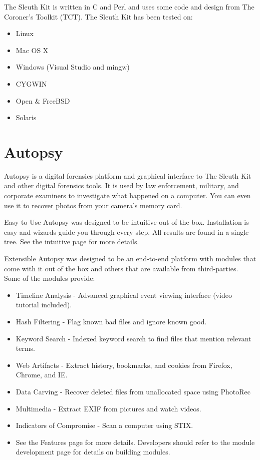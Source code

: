 The Sleuth Kit is written in C and Perl and uses some code and design from 
The Coroner's Toolkit (TCT). The Sleuth Kit has been tested on:

\begin{itemize}
\item Linux
\item Mac OS X
\item Windows (Visual Studio and mingw)
\item CYGWIN
\item Open \& FreeBSD
\item Solaris
\end{itemize}

\section{Autopsy}

Autopsy is a digital forensics platform and graphical interface to The Sleuth Kit
and other digital forensics tools. It is used by law enforcement, military, 
and corporate examiners to investigate what happened on a computer. You can even 
use it to recover photos from your camera's memory card.

Easy to Use
Autopsy was designed to be intuitive out of the box. Installation is easy and
wizards guide you through every step. All results are found in a single tree.
See the intuitive page for more details.

Extensible
Autopsy was designed to be an end-to-end platform with modules that come with
it out of the box and others that are available from third-parties. Some of the
modules provide:

\begin{itemize}
\item Timeline Analysis - Advanced graphical event viewing interface (video 
tutorial included).
\item Hash Filtering - Flag known bad files and ignore known good.
\item Keyword Search - Indexed keyword search to find files that mention relevant
terms.
\item Web Artifacts - Extract history, bookmarks, and cookies from Firefox, Chrome,
and IE.
\item Data Carving - Recover deleted files from unallocated space using PhotoRec
\item Multimedia - Extract EXIF from pictures and watch videos.
\item Indicators of Compromise - Scan a computer using STIX.
\item See the Features page for more details. Developers should refer to the
module development page for details on building modules.
\end{itemize}

